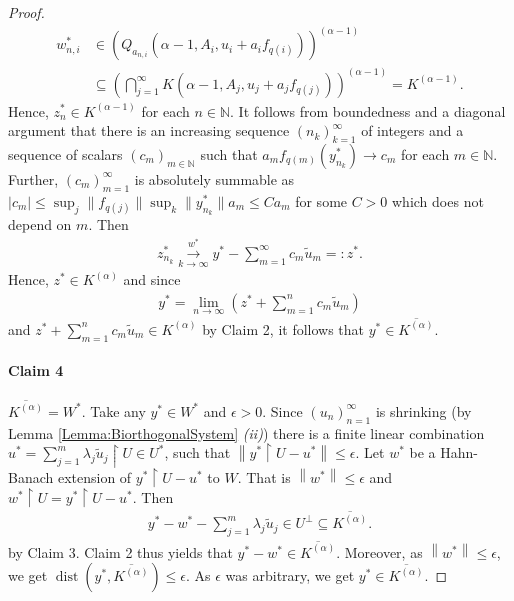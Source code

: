 \documentclass{amsart}
\theoremstyle{definition}
\newcommand{\norm}[1]{\left\lVert#1\right\rVert}
\begin{document}
\begin{proof}
    \begin{align*}
        w_{n,i}^* &\in \left(Q_{a_{n,i}}(\alpha-1,A_i,u_i + a_i f_{q(i)})\right)^{(\alpha-1)} \\
        &\subseteq \left( \bigcap_{j=1}^\infty K(\alpha-1,A_j,u_j + a_j f_{q(j)}) \right)^{(\alpha-1)} = K^{(\alpha-1)}.
    \end{align*}
    Hence, $z_n^* \in K^{(\alpha - 1)}$ for each $n \in \mathbb{N}$. It follows from boundedness and a diagonal argument that there is an increasing sequence $(n_k)_{k=1}^\infty$ of integers and a sequence of scalars $(c_m)_{m \in \mathbb{N}}$ such that $a_m f_{q(m)}(y_{n_k}^*) \rightarrow c_m$ for each $m \in \mathbb{N}$. Further, $(c_m)_{m=1}^\infty$ is absolutely summable as $|c_m| \leq \sup_j \|f_{q(j)}\| \sup_k \|y_{n_k}^*\| a_m \leq C a_m$ for some $C>0$ which does not depend on $m$. Then
    \begin{align*}
        z_{n_k}^* \overset{w^*}{\underset{k \rightarrow \infty}{\longrightarrow}} y^* - \sum_{m=1}^\infty c_m \widetilde{u}_m =: z^*.
    \end{align*}
    Hence, $z^* \in K^{(\alpha)}$ and since
    \begin{align*}
        y^* = \lim_{n \rightarrow \infty} \left( z^* + \sum_{m=1}^n c_m \widetilde{u}_m \right)
    \end{align*}
    and $z^* + \sum_{m=1}^n c_m \widetilde{u}_m \in K^{(\alpha)}$ by Claim 2, it follows that $y^* \in \overline{K^{(\alpha)}}$.
    
    \paragraph*{\textbf{Claim 4}} $\overline{K^{(\alpha)}} = W^*$. Take any $y^* \in W^*$ and $\epsilon > 0$. Since $(u_n)_{n=1}^\infty$ is shrinking (by Lemma \ref{Lemma:BiorthogonalSystem} \textit{(ii)}) there is a finite linear combination $u^* = \sum_{j=1}^m \lambda_j \widetilde{u}_j \restriction U \in U^*$, such that $\norm{y^* \restriction U - u^*} \leq \epsilon$. Let $w^*$ be a Hahn-Banach extension of $y^* \restriction U - u^*$ to $W$. That is $\norm{w^*} \leq \epsilon$ and $w^* \restriction U = y^* \restriction U - u^*$. Then
    \begin{align*}
        y^* - w^* - \sum_{j=1}^m \lambda_j \widetilde{u}_j \in U^\perp \subseteq \overline{K^{(\alpha)}}.
    \end{align*}
    by Claim 3. Claim 2 thus yields that $y^* - w^* \in \overline{K^{(\alpha)}}$. Moreover, as $\norm{w^*} \leq \epsilon$, we get $\operatorname{dist}(y^*, \overline{K^{(\alpha)}}) \leq \epsilon$. As $\epsilon$ was arbitrary, we get $y^* \in \overline{K^{(\alpha)}}$.
\end{proof}
\end{document}
